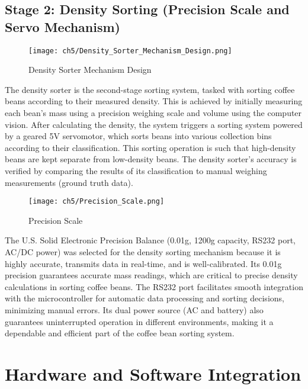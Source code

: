 \subsection{Stage 2: Density Sorting (Precision Scale and Servo Mechanism)}
\label{sec:density_sorter}

\begin{figure}[H]
    \centering
    \texttt{[image: ch5/Density\_Sorter\_Mechanism\_Design.png]}
    \caption{Density Sorter Mechanism Design}
    \label{fig:density_sorter_design}
\end{figure}
The density sorter is the second-stage sorting system, tasked with sorting coffee beans according to their measured density. This is achieved by initially measuring each bean's mass using a precision weighing scale and volume using the computer vision. After calculating the density, the system triggers a sorting system powered by a geared 5V  servomotor, which sorts beans into various collection bins according to their classification. This sorting operation is such that high-density beans are kept separate from low-density beans. The density sorter's accuracy is verified by comparing the results of its classification to manual weighing measurements (ground truth data).

\begin{figure}[H]
    \centering
    \texttt{[image: ch5/Precision\_Scale.png]}
    \caption{Precision Scale}
    \label{fig:precision_scale}
\end{figure}
The U.S. Solid Electronic Precision Balance (0.01g, 1200g capacity, RS232 port, AC/DC power) was selected for the density sorting mechanism because it is highly accurate, transmits data in real-time, and is well-calibrated. Its 0.01g precision guarantees accurate mass readings, which are critical to precise density calculations in sorting coffee beans. The RS232 port facilitates smooth integration with the microcontroller for automatic data processing and sorting decisions, minimizing manual errors. Its dual power source (AC and battery) also guarantees uninterrupted operation in different environments, making it a dependable and efficient part of the coffee bean sorting system.

\section{Hardware and Software Integration}


